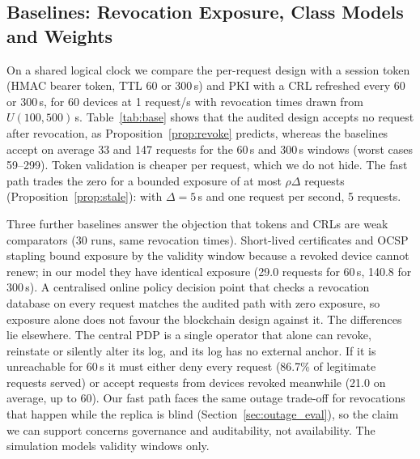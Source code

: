 \subsection{Baselines: Revocation Exposure, Class Models and Weights}\label{sec:baselines}
On a shared logical clock we compare the per-request design with a session token (HMAC bearer token, TTL 60 or 300\,s) and PKI with a CRL refreshed every 60 or 300\,s, for 60 devices at 1 request/s with revocation times drawn from $U(100,500)$\,s. Table~\ref{tab:base} shows that the audited design accepts no request after revocation, as Proposition~\ref{prop:revoke} predicts, whereas the baselines accept on average 33 and 147 requests for the 60\,s and 300\,s windows (worst cases 59--299). Token validation is cheaper per request, which we do not hide. The fast path trades the zero for a bounded exposure of at most $\rho\Delta$ requests (Proposition~\ref{prop:stale}): with $\Delta=5$\,s and one request per second, 5 requests.

\begin{table}[t]
\centering
\caption{Revocation exposure (requests accepted after revocation; 60 devices, 1 req/s) and mean decision latency}
\label{tab:base}
\scriptsize

\end{table}

Three further baselines answer the objection that tokens and CRLs are weak comparators (30 runs, same revocation times). Short-lived certificates and OCSP stapling bound exposure by the validity window because a revoked device cannot renew; in our model they have identical exposure (29.0 requests for 60\,s, 140.8 for 300\,s). A centralised online policy decision point that checks a revocation database on every request matches the audited path with zero exposure, so exposure alone does not favour the blockchain design against it. The differences lie elsewhere. The central PDP is a single operator that alone can revoke, reinstate or silently alter its log, and its log has no external anchor. If it is unreachable for 60\,s it must either deny every request (86.7\% of legitimate requests served) or accept requests from devices revoked meanwhile (21.0 on average, up to 60). Our fast path faces the same outage trade-off for revocations that happen while the replica is blind (Section~\ref{sec:outage_eval}), so the claim we can support concerns governance and auditability, not availability. The simulation models validity windows only.

